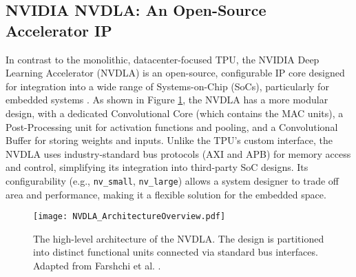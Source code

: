 \subsection{NVIDIA NVDLA: An Open-Source Accelerator IP}
In contrast to the monolithic, datacenter-focused TPU, the NVIDIA Deep Learning Accelerator (NVDLA) is an open-source, configurable IP core designed for integration into a wide range of Systems-on-Chip (SoCs), particularly for embedded systems \cite{farshchi2019nvdla}. As shown in Figure \ref{fig:nvdla_diagram}, the NVDLA has a more modular design, with a dedicated Convolutional Core (which contains the MAC units), a Post-Processing unit for activation functions and pooling, and a Convolutional Buffer for storing weights and inputs. Unlike the TPU's custom interface, the NVDLA uses industry-standard bus protocols (AXI and APB) for memory access and control, simplifying its integration into third-party SoC designs. Its configurability (e.g., \texttt{nv\_small}, \texttt{nv\_large}) allows a system designer to trade off area and performance, making it a flexible solution for the embedded space.

\begin{figure}[htbp]
    \centering
    \texttt{[image: NVDLA\_ArchitectureOverview.pdf]} 
    \caption[The NVDLA High-Level Architecture]{The high-level architecture of the NVDLA. The design is partitioned into distinct functional units connected via standard bus interfaces. Adapted from Farshchi et al. \cite{farshchi2019nvdla}.}
    \label{fig:nvdla_diagram}
\end{figure}

